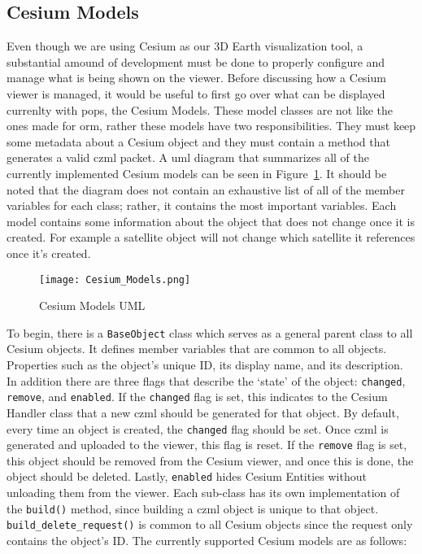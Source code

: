 \subsection{Cesium Models}\label{sec:cesium-models}

Even though we are using Cesium as our 3D Earth visualization tool, a
substantial amound of development must be done to properly configure and manage
what is being shown on the viewer. Before discussing how a Cesium viewer is
managed, it would be useful to first go over what can be displayed currenlty
with \gls{pops}, the Cesium Models. These model classes are not like the ones
made for \gls{orm}, rather these models have two responsibilities. They must
keep some metadata about a Cesium object and they must contain a method that
generates a valid \gls{czml} packet.  A \gls{uml} diagram that summarizes all
of the currently implemented Cesium models can be seen in
Figure~\ref{fig:cesium_models}. It should be noted that the diagram does not
contain an exhaustive list of all of the member variables for each class;
rather, it contains the most important variables.  Each model contains some
information about the object that does not change once it is created. For
example a satellite object will not change which satellite it references once
it's created. 

\begin{figure} 
    \centering
    \texttt{[image: Cesium\_Models.png]} 
    \caption{Cesium Models UML} 
    \label{fig:cesium_models} 
\end{figure}

To begin, there is a \texttt{BaseObject} class which serves as a general parent
class to all Cesium objects. It defines member variables that are common to all
objects. Properties such as the object's unique ID, its display name, and its
description. In addition there are three flags that describe the `state' of the
object: \texttt{changed}, \texttt{remove}, and \texttt{enabled}. If the
\texttt{changed} flag is set, this indicates to the Cesium Handler class that a
new \gls{czml} should be generated for that object. By default, every time an
object is created, the \texttt{changed} flag should be set. Once \gls{czml} is
generated and uploaded to the viewer, this flag is reset. If the
\texttt{remove} flag is set, this object should be removed from the Cesium
viewer, and once this is done, the object should be deleted. Lastly,
\texttt{enabled} hides Cesium Entities without unloading them from the viewer.
Each sub-class has its own implementation of the \texttt{build()} method, since
building a \gls{czml} object is unique to that object.
\texttt{build\_delete\_request()} is common to all Cesium objects since the
request only contains the object's ID. The currently supported Cesium models
are as follows:

